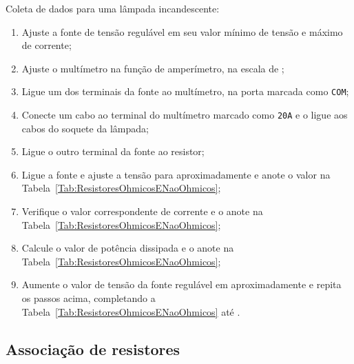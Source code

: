 Coleta de dados para uma lâmpada incandescente:
\begin{enumerate}
	\item Ajuste a fonte de tensão regulável em seu valor mínimo de tensão e máximo de corrente; 
	\item Ajuste o multímetro na função de amperímetro, na escala de ;
	\item Ligue um dos terminais da fonte ao multímetro, na porta marcada como \texttt{COM};
	\item Conecte um cabo ao terminal do multímetro marcado como \texttt{20A} e o ligue aos cabos do soquete da lâmpada;
	\item Ligue o outro terminal da fonte ao resistor;
	\item Ligue a fonte e ajuste a tensão para aproximadamente  e anote o valor na Tabela~\ref{Tab:ResistoresOhmicosENaoOhmicos};
	\item Verifique o valor correspondente de corrente e o anote na Tabela~\ref{Tab:ResistoresOhmicosENaoOhmicos};
	\item Calcule o valor de potência dissipada e o anote na Tabela~\ref{Tab:ResistoresOhmicosENaoOhmicos};
	\item Aumente o valor de tensão da fonte regulável em aproximadamente  e repita os passos acima, completando a Tabela~\ref{Tab:ResistoresOhmicosENaoOhmicos} até . 
\end{enumerate}

\subsection{Associação de resistores}

\cleardoublepage


\vspace{15mm}

